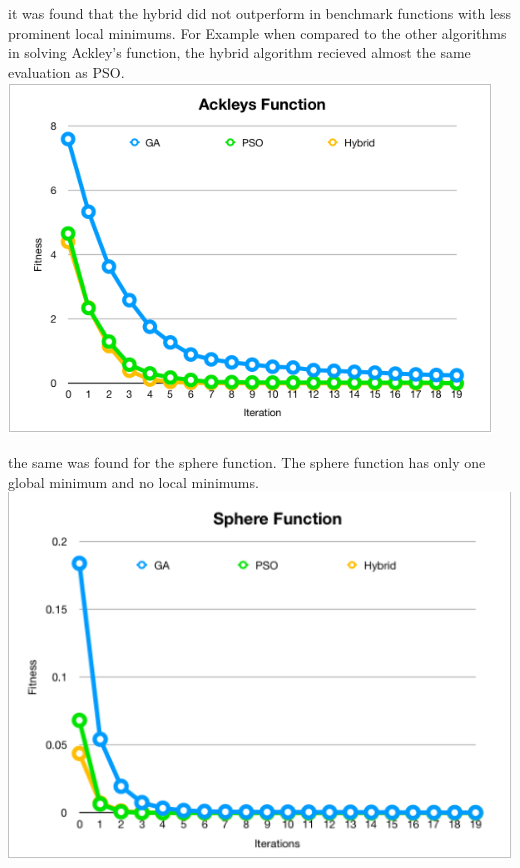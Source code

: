\documentclass[twocolumn]{article}
\begin{document}
it was found that the hybrid did not outperform in benchmark functions with less prominent local minimums. For Example when compared to the other algorithms in solving Ackley's function, the hybrid algorithm recieved almost the same evaluation as PSO.
\\


\includegraphics[scale=0.45]{Images/Ackley.png} 

the same was found for the sphere function. The sphere function has only one global minimum and no local minimums.
\\

\includegraphics[scale=0.45]{Images/Sphere.png} 
\end{document}
